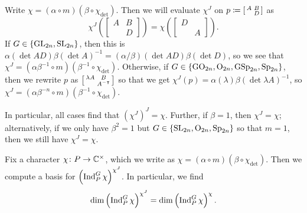 \begin{remark}
	Write $\chi=(\alpha\circ m)(\beta\circ\chi_{\det})$. Then we will evaluate $\chi^J$ on $p\coloneqq\begin{bsmallmatrix}
		A & B \\ & D
	\end{bsmallmatrix}$ as
	\[\chi^J\left(\begin{bmatrix}
		A & B \\ & D
	\end{bmatrix}\right)=\chi\left(\begin{bmatrix}
		D \\ & A
	\end{bmatrix}\right).\]
	If $G\in\{\mathrm{GL}_{2n},\mathrm{SL}_{2n}\}$, then this is $\alpha(\det AD)\beta(\det A)^{-1}=(\alpha/\beta)(\det AD)\beta(\det D)$, so we see that $\chi^J=\left(\alpha\beta^{-1}\circ m\right)\left(\beta^{-1}\circ\chi_{\det}\right)$. Otherwise, if $G\in\{\mathrm{GO}_{2n},\mathrm{O}_{2n},\mathrm{GSp}_{2n},\mathrm{Sp}_{2n}\}$, then we rewrite $p$ as $\begin{bsmallmatrix}
		\lambda A & B \\ & A^{-\intercal}
	\end{bsmallmatrix}$ so that we get $\chi^J(p)=\alpha(\lambda)\beta(\det\lambda A)^{-1}$, so $\chi^J=\left(\alpha\beta^{-n}\circ m\right)\left(\beta^{-1}\circ\chi_{\det}\right)$.
	
	In particular, all cases find that $\left(\chi^J\right)^J=\chi$. Further, if $\beta=1$, then $\chi^J=\chi$; alternatively, if we only have $\beta^2=1$ but $G\in\{\mathrm{SL}_{2n},\mathrm{O}_{2n},\mathrm{Sp}_{2n}\}$ so that $m=1$, then we still have $\chi^J=\chi$.
\end{remark}
\begin{proposition} \label{prop:twisted-ind-basis}
	Fix a character $\chi\colon P\to\mathbb C^\times$, which we write as $\chi=(\alpha\circ m)(\beta\circ\chi_{\det})$. Then we compute a basis for $\left(\operatorname{Ind}_P^G\chi\right)^{\chi^J}$. In particular, we find
	\[\dim\left(\operatorname{Ind}_P^G\chi\right)^{\chi^J}=\dim\left(\operatorname{Ind}_P^G\chi\right)^{\chi}.\]
\end{proposition}
